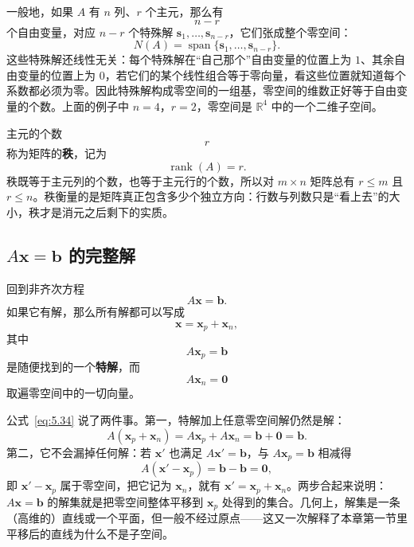 \documentclass[UTF8,a4paper,12pt]{ctexart}
\numberwithin{equation}{section}
\newcommand{\R}{\mathbb{R}}
\begin{document}
	一般地，如果 $A$ 有 $n$ 列、$r$ 个主元，那么有
	\begin{equation}\label{eq:5.29}
	n-r
	\end{equation}
	个自由变量，对应 $n-r$ 个特殊解 $\bm{s}_1,\ldots,\bm{s}_{n-r}$，它们张成整个零空间：
	\begin{equation}\label{eq:5.30}
	N(A)
	=
	\operatorname{span}\{\bm{s}_1,\ldots,\bm{s}_{n-r}\}.
	\end{equation}
	这些特殊解还线性无关：每个特殊解在“自己那个”自由变量的位置上为 $1$、其余自由变量的位置上为 $0$，若它们的某个线性组合等于零向量，看这些位置就知道每个系数都必须为零。因此特殊解构成零空间的一组基，零空间的维数正好等于自由变量的个数。上面的例子中 $n=4$，$r=2$，零空间是 $\R^4$ 中的一个二维子空间。
	
	主元的个数
	\begin{equation}\label{eq:5.31}
	r
	\end{equation}
	称为矩阵的\textbf{秩}，记为
	\begin{equation}\label{eq:5.32}
	\operatorname{rank}(A)=r.
	\end{equation}
	秩既等于主元列的个数，也等于主元行的个数，所以对 $m\times n$ 矩阵总有 $r\le m$ 且 $r\le n$。秩衡量的是矩阵真正包含多少个独立方向：行数与列数只是“看上去”的大小，秩才是消元之后剩下的实质。
	
	\subsection{\texorpdfstring{$A\bm{x}=\bm{b}$}{Ax=b} 的完整解}
	
	回到非齐次方程
	\begin{equation}\label{eq:5.33}
	A\bm{x}=\bm{b}.
	\end{equation}
	如果它有解，那么所有解都可以写成
	\begin{equation}\label{eq:5.34}
	\boxed{\bm{x}=\bm{x}_p+\bm{x}_n,}
	\end{equation}
	其中
	\begin{equation}\label{eq:5.35}
	A\bm{x}_p=\bm{b}
	\end{equation}
	是随便找到的一个\textbf{特解}，而
	\begin{equation}\label{eq:5.36}
	A\bm{x}_n=\bm{0}
	\end{equation}
	取遍零空间中的一切向量。
	
公式~\eqref{eq:5.34} 说了两件事。第一，特解加上任意零空间解仍然是解：
	\begin{equation}\label{eq:5.37}
	A(\bm{x}_p+\bm{x}_n)
	=A\bm{x}_p+A\bm{x}_n
	=\bm{b}+\bm{0}
	=\bm{b}.
	\end{equation}
	第二，它不会漏掉任何解：若 $\bm{x}'$ 也满足 $A\bm{x}'=\bm{b}$，与 $A\bm{x}_p=\bm{b}$ 相减得
	\begin{equation}\label{eq:5.38}
	A(\bm{x}'-\bm{x}_p)=\bm{b}-\bm{b}=\bm{0},
	\end{equation}
	即 $\bm{x}'-\bm{x}_p$ 属于零空间，把它记为 $\bm{x}_n$，就有 $\bm{x}'=\bm{x}_p+\bm{x}_n$。两步合起来说明：$A\bm{x}=\bm{b}$ 的解集就是把零空间整体平移到 $\bm{x}_p$ 处得到的集合。几何上，解集是一条（高维的）直线或一个平面，但一般不经过原点——这又一次解释了本章第一节里平移后的直线为什么不是子空间。
	
\end{document}

